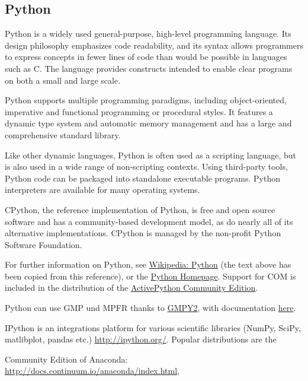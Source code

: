 \newpage
\subsection{Python}
Python is a widely used general-purpose, high-level programming language. Its design philosophy emphasizes code readability, and its syntax allows programmers to express concepts in fewer lines of code than would be possible in languages such as C. The language provides constructs intended to enable clear programs on both a small and large scale.

\vpara
Python supports multiple programming paradigms, including object-oriented, imperative and functional programming or procedural styles. It features a dynamic type system and automatic memory management and has a large and comprehensive standard library.

\vpara
Like other dynamic languages, Python is often used as a scripting language, but is also used in a wide range of non-scripting contexts. Using third-party tools, Python code can be packaged into standalone executable programs. Python interpreters are available for many operating systems.

\vpara
CPython, the reference implementation of Python, is free and open source software and has a community-based development model, as do nearly all of its alternative implementations. CPython is managed by the non-profit Python Software Foundation.

\vpara
For further information on Python, see \href{http://en.wikipedia.org/wiki/Python_(programming_language)}{Wikipedia: Python} (the text above has been copied from this reference), or the  \href{http://www.python.org/}{Python Homepage}. Support for COM is included in the distribution of the \href{http://www.activestate.com/activepython/downloads}{ActivePython Community Edition}.

\vpara
Python can use  GMP und MPFR thanks to \href{http://code.google.com/p/gmpy/}{GMPY2}, with documentation \href{https://gmpy2.readthedocs.org/en/latest/}{here}.

\vpara
IPython is an integrations platform for various scientific libraries (NumPy, SciPy, matlibplot, pandas etc.) \href{http://ipython.org/}{http://ipython.org/}. Popular distributions are the 

Community Edition of Anaconda: \href{http://docs.continuum.io/anaconda/index.html}{http://docs.continuum.io/anaconda/index.html}, 

%


